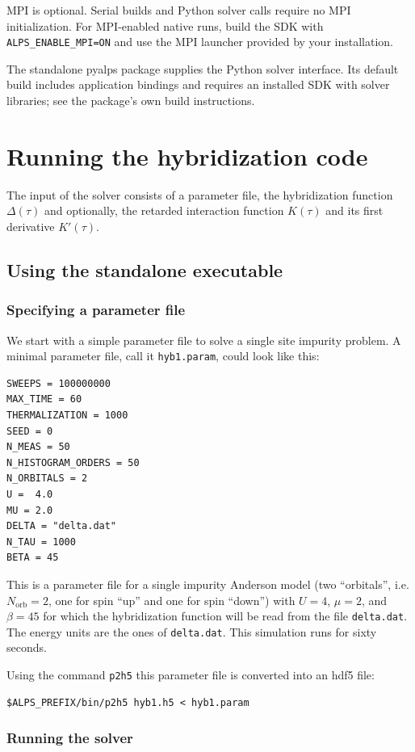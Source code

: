 \documentclass[aps,prb,floatfix,superscriptaddress,twocolumn,notitlepage]{revtex4-1}
\begin{document}
MPI is optional. Serial builds and Python solver calls require no MPI initialization. For MPI-enabled native runs, build the SDK with \verb#ALPS_ENABLE_MPI=ON# and use the MPI launcher provided by your installation.

The standalone pyalps package supplies the Python solver interface. Its default build includes application bindings and requires an installed SDK with solver libraries; see the package's own build instructions.

\section{Running the hybridization code}

The input of the solver consists of a parameter file, the hybridization function $\Delta(\tau)$ and optionally, the retarded interaction function $K(\tau)$ and its first derivative $K'(\tau)$.

\subsection{Using the standalone executable}

\subsubsection{Specifying a parameter file}
We start with a simple parameter file to solve a single site impurity problem. A minimal parameter file, call it \verb#hyb1.param#, could look like this:
\begin{verbatim}
SWEEPS = 100000000
MAX_TIME = 60
THERMALIZATION = 1000
SEED = 0
N_MEAS = 50
N_HISTOGRAM_ORDERS = 50
N_ORBITALS = 2
U =  4.0
MU = 2.0
DELTA = "delta.dat"
N_TAU = 1000
BETA = 45
\end{verbatim}
This is a parameter file for a single impurity Anderson model (two ``orbitals'', i.e. $N_{\text{orb}}=2$, one for spin ``up'' and one for spin ``down'') with $U=4$, $\mu=2$, and $\beta=45$ for which the hybridization function will be read from the file \verb#delta.dat#. The energy units are the ones of \verb#delta.dat#. This simulation runs for sixty seconds.

Using the command \verb#p2h5# this parameter file is converted into an hdf5 file:
\begin{verbatim}
$ALPS_PREFIX/bin/p2h5 hyb1.h5 < hyb1.param
\end{verbatim}

\subsubsection{Running the solver}
\end{document}
